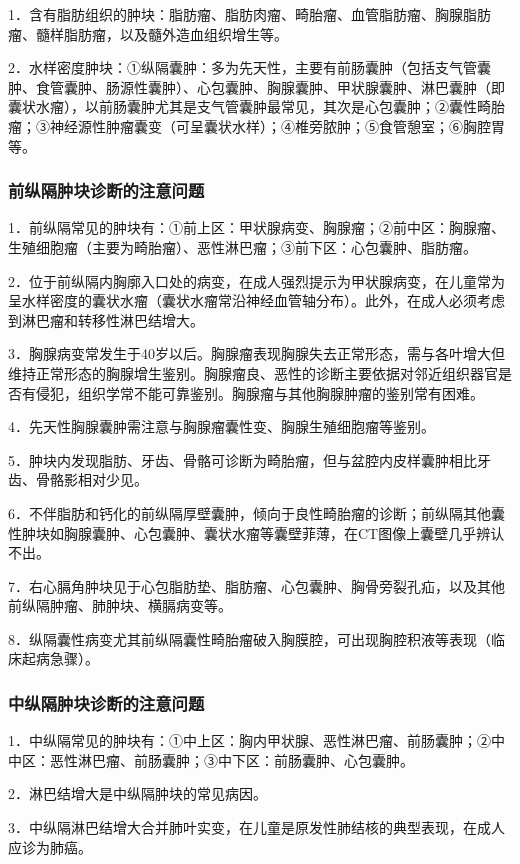 1．含有脂肪组织的肿块：脂肪瘤、脂肪肉瘤、畸胎瘤、血管脂肪瘤、胸腺脂肪瘤、髓样脂肪瘤，以及髓外造血组织增生等。

2．水样密度肿块：①纵隔囊肿：多为先天性，主要有前肠囊肿（包括支气管囊肿、食管囊肿、肠源性囊肿）、心包囊肿、胸腺囊肿、甲状腺囊肿、淋巴囊肿（即囊状水瘤），以前肠囊肿尤其是支气管囊肿最常见，其次是心包囊肿；②囊性畸胎瘤；③神经源性肿瘤囊变（可呈囊状水样）；④椎旁脓肿；⑤食管憩室；⑥胸腔胃等。

\subsubsection{前纵隔肿块诊断的注意问题}

1．前纵隔常见的肿块有：①前上区：甲状腺病变、胸腺瘤；②前中区：胸腺瘤、生殖细胞瘤（主要为畸胎瘤）、恶性淋巴瘤；③前下区：心包囊肿、脂肪瘤。

2．位于前纵隔内胸廓入口处的病变，在成人强烈提示为甲状腺病变，在儿童常为呈水样密度的囊状水瘤（囊状水瘤常沿神经血管轴分布）。此外，在成人必须考虑到淋巴瘤和转移性淋巴结增大。

3．胸腺病变常发生于40岁以后。胸腺瘤表现胸腺失去正常形态，需与各叶增大但维持正常形态的胸腺增生鉴别。胸腺瘤良、恶性的诊断主要依据对邻近组织器官是否有侵犯，组织学常不能可靠鉴别。胸腺瘤与其他胸腺肿瘤的鉴别常有困难。

4．先天性胸腺囊肿需注意与胸腺瘤囊性变、胸腺生殖细胞瘤等鉴别。

5．肿块内发现脂肪、牙齿、骨骼可诊断为畸胎瘤，但与盆腔内皮样囊肿相比牙齿、骨骼影相对少见。

6．不伴脂肪和钙化的前纵隔厚壁囊肿，倾向于良性畸胎瘤的诊断；前纵隔其他囊性肿块如胸腺囊肿、心包囊肿、囊状水瘤等囊壁菲薄，在CT图像上囊壁几乎辨认不出。

7．右心膈角肿块见于心包脂肪垫、脂肪瘤、心包囊肿、胸骨旁裂孔疝，以及其他前纵隔肿瘤、肺肿块、横膈病变等。

8．纵隔囊性病变尤其前纵隔囊性畸胎瘤破入胸膜腔，可出现胸腔积液等表现（临床起病急骤）。

\subsubsection{中纵隔肿块诊断的注意问题}

1．中纵隔常见的肿块有：①中上区：胸内甲状腺、恶性淋巴瘤、前肠囊肿；②中中区：恶性淋巴瘤、前肠囊肿；③中下区：前肠囊肿、心包囊肿。　

2．淋巴结增大是中纵隔肿块的常见病因。

3．中纵隔淋巴结增大合并肺叶实变，在儿童是原发性肺结核的典型表现，在成人应诊为肺癌。

